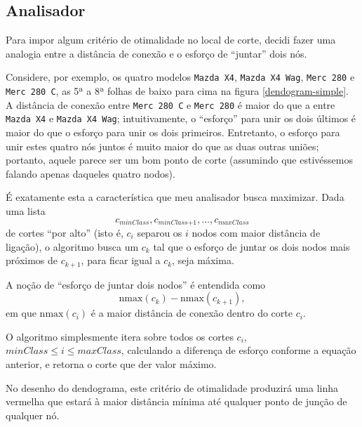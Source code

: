 \documentclass{article}
\begin{document}
\subsection{Analisador}

Para impor algum critério de otimalidade no local de corte,
decidi fazer uma analogia entre a distância de conexão
e o esforço de ``juntar'' dois nós.

Considere, por exemplo, os quatro modelos
\verb"Mazda X4", \verb"Mazda X4 Wag", \verb"Merc 280" e \verb"Merc 280 C",
as 5ª a 8ª folhas de baixo para cima na figura \ref{dendogram-simple}.
A distância de conexão entre \verb"Merc 280 C" e \verb"Merc 280"
é maior do que a entre \verb"Mazda X4" e \verb"Mazda X4 Wag";
intuitivamente,
o ``esforço'' para unir os dois últimos
é maior do que o esforço para unir os dois primeiros.
Entretanto, o esforço para unir estes quatro nós juntos
é muito maior do que as duas outras uniões;
portanto, aquele parece ser um bom ponto de corte
(assumindo que estivéssemos falando apenas daqueles quatro nodos).

É exatamente esta a característica que meu analisador busca maximizar.
Dada uma lista
\begin{equation*}
    c_{\textit{minClass}}, c_{\textit{minClass+1}}, \dots, c_{\textit{maxClass}}
\end{equation*}
de cortes ``por alto''
(isto é, $c_i$ separou os $i$ nodos com maior distância de ligação),
o algoritmo busca um $c_k$ tal que
o esforço de juntar os dois nodos mais próximos de $c_{k+1}$,
para ficar igual a $c_k$,
seja máxima.

A noção de ``esforço de juntar dois nodos'' é entendida como
\begin{equation*}
    \textrm{nmax}(c_k) - \textrm{nmax}(c_{k+1}),
\end{equation*}
em que $\textrm{nmax}(c_i)$ é a maior distância de conexão dentro do corte $c_i$.

O algoritmo simplesmente itera sobre todos os cortes $c_i$,
$\textit{minClass} \leq i \leq \textit{maxClass}$,
calculando a diferença de esforço conforme a equação anterior,
e retorna o corte que der valor máximo.

No desenho do dendograma,
este critério de otimalidade produzirá uma linha vermelha
que estará à maior distância mínima até qualquer ponto de junção de qualquer nó.
\end{document}

